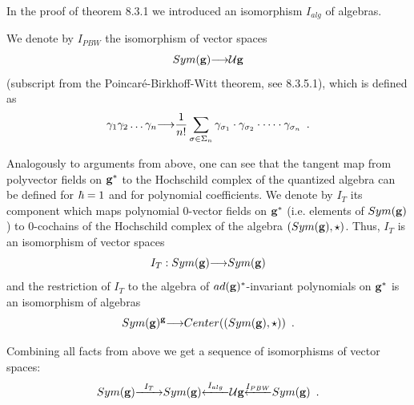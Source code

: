                   
                  	In the proof of theorem 8.3.1 we introduced
                  	 an isomorphism $I_{alg}$ of algebras.
                        
                              We denote by $I_{PBW}$ the isomorphism of
                              vector spaces
                              $$Sym({\bf g}){\longrightarrow} {\cal U}
                              {\bf g}$$ 
                              (subscript from the 
                              Poincar\'e-Birkhoff-Witt theorem, see 8.3.5.1),
                              which is defined as
                              $${\gamma}_1{\gamma}_2\dots{\gamma}_n{\longrightarrow} 
                              {1\over n!}\sum_{\sigma\in\Sigma_n}
                              {\gamma}_
                              {\sigma_1}
                              \cdot{\gamma}_{\sigma_2}
                              \cdot\dots\cdot {\gamma}_{\sigma_n}\,\,\,.$$
                              
                            Analogously to arguments from above, one can see
                             that the tangent map from polyvector fields
                          on ${\bf g}^*$ to the Hochschild complex
                           of the quantized algebra can be defined for 
                           ${\hbar}=1$ and
                           for polynomial coefficients. We denote by $I_T$ its
                           component which maps polynomial
                            $0$-vector fields on ${\bf g}^*$
                            (i.e. elements of $Sym({\bf g})$) to $0$-cochains 
                            of the 
                            Hochschild complex of the algebra $(Sym(
                            {\bf g}),\star)$.
                            Thus, $I_T$ is an isomorphism of vector spaces
                            $$I_T:Sym({\bf g}){\longrightarrow} Sym({\bf g})$$
                         and the restriction of $I_T$ to
                         the algebra of $ad({\bf g})^*$-invariant polynomials 
                         on ${\bf g}^*$
                          is an isomorphism of algebras
                          $$Sym({\bf g})^{\bf g}{\longrightarrow} Center((Sym({\bf g}),\star))\,\,\,.$$
                          
                          Combining all facts from above we get a sequence of 
                          isomorphisms of vector spaces:
                        $$Sym(\g){\buildrel I_T\over  \raa }
                         Sym(\g )
                         {\buildrel I_{alg} \over \laa}\U\g
                        {\buildrel I_{PBW} \over\laa }
                        Sym(\g)\,\,\,.$$
                        
